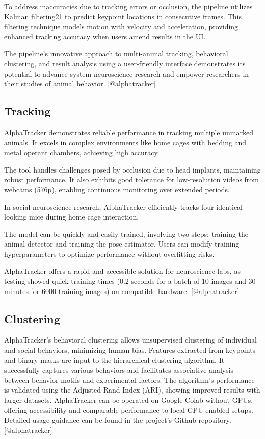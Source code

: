 \documentclass[
  11pt,
]{article}
\begin{document}
To address inaccuracies due to tracking errors or occlusion, the
pipeline utilizes Kalman filtering21 to predict keypoint locations in
consecutive frames. This filtering technique models motion with velocity
and acceleration, providing enhanced tracking accuracy when users amend
results in the UI.

The pipeline's innovative approach to multi-animal tracking, behavioral
clustering, and result analysis using a user-friendly interface
demonstrates its potential to advance system neuroscience research and
empower researchers in their studies of animal behavior.
{[}@alphatracker{]}

\hypertarget{tracking}{%
\subsection{Tracking}\label{tracking}}

AlphaTracker demonstrates reliable performance in tracking multiple
unmarked animals. It excels in complex environments like home cages with
bedding and metal operant chambers, achieving high accuracy.

The tool handles challenges posed by occlusion due to head implants,
maintaining robust performance. It also exhibits good tolerance for
low-resolution videos from webcams (576p), enabling continuous
monitoring over extended periods.

In social neuroscience research, AlphaTracker efficiently tracks four
identical-looking mice during home cage interaction.

The model can be quickly and easily trained, involving two steps:
training the animal detector and training the pose estimator. Users can
modify training hyperparameters to optimize performance without
overfitting risks.

AlphaTracker offers a rapid and accessible solution for neuroscience
labs, as testing showed quick training times (0.2 seconds for a batch of
10 images and 30 minutes for 6000 training images) on compatible
hardware. {[}@alphatracker{]}

\hypertarget{clustering}{%
\subsection{Clustering}\label{clustering}}

AlphaTracker's behavioral clustering allows unsupervised clustering of
individual and social behaviors, minimizing human bias. Features
extracted from keypoints and binary masks are input to the hierarchical
clustering algorithm. It successfully captures various behaviors and
facilitates associative analysis between behavior motifs and
experimental factors. The algorithm's performance is validated using the
Adjusted Rand Index (ARI), showing improved results with larger
datasets. AlphaTracker can be operated on Google Colab without GPUs,
offering accessibility and comparable performance to local GPU-enabled
setups. Detailed usage guidance can be found in the project's Github
repository. {[}@alphatracker{]}
\end{document}
